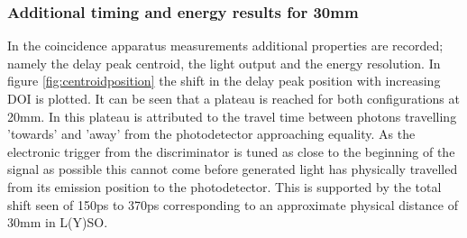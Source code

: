 \subsubsection{Additional timing and energy results for 30mm}
In the coincidence apparatus measurements additional properties are recorded; namely the delay peak centroid, the light output and the energy resolution. In figure \ref{fig:centroidposition} the shift in the delay peak position with increasing DOI is plotted. It can be seen that a plateau is reached for both configurations at 20mm. In \cite{Moses_Derenzo_1999} this plateau is attributed to the travel time between photons travelling 'towards' and 'away' from the photodetector approaching equality. As the electronic trigger from the discriminator is tuned as close to the beginning of the signal as possible this cannot come before generated light has physically travelled from its emission position to the photodetector. This is supported by the total shift seen of 150ps to 370ps corresponding to an approximate physical distance of 30mm in L(Y)SO.
